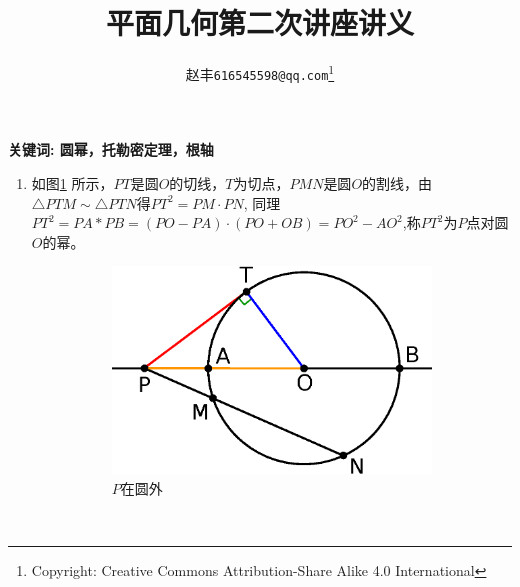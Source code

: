 \documentclass[12pt]{article}
\begin{document}
\title{平面几何第二次讲座讲义}
\author{赵丰\footnotesize \texttt{616545598@qq.com}\footnote{Copyright: Creative Commons Attribution-Share Alike 4.0 International}}
\maketitle
{\bf 关键词: 圆幂，托勒密定理，根轴}
\begin{enumerate}
\item 
如图\ref{fig:Power_point_simple} 所示，$PT$是圆$O$的切线，$T$为切点，$PMN$是圆$O$的割线，由$\triangle PTM\sim \triangle PTN$得$PT^2=PM\cdot PN$,
同理$PT^2=PA*PB=(PO-PA)\cdot(PO+OB)=PO^2-AO^2$,称$PT^2$为$P$点对圆$O$的幂。

    \begin{figure}[!ht]
    \centering
    \begin{subfigure}[b]{0.53\textwidth}
    \includegraphics[width=\textwidth]{Power_point_simple.eps}
    \caption{$P$在圆外}\label{fig:Power_point_simple}
    \end{subfigure}~
    \begin{subfigure}[b]{0.37\textwidth}


\end{subfigure}
\end{figure}
\end{enumerate}
\end{document}
